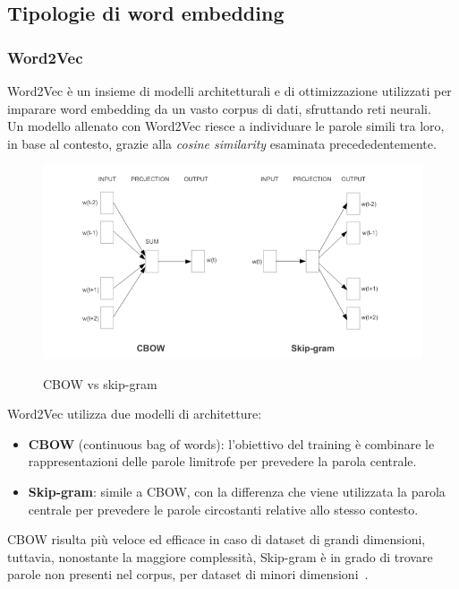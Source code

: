 \subsection{Tipologie di word embedding}
\label{sec:tipologie di word embedding}
\subsubsection{Word2Vec}
\label{sec:word2vec}
Word2Vec è un insieme di modelli architetturali e di ottimizzazione utilizzati per imparare word embedding da un vasto corpus di dati, sfruttando reti neurali.
\\
Un modello allenato con Word2Vec riesce a individuare le parole simili tra loro, in base al contesto, grazie alla \textit{cosine similarity} esaminata precededentemente.

\begin{figure}[h]
    \centering
    \includegraphics[width=15cm]{./immagini/cbow_vs_skipgram.png}
    \label{cbowskipgram}
    \caption{CBOW vs skip-gram~\cite{mikolov2013efficient}}
\end{figure}
\newpage
Word2Vec utilizza due modelli di architetture:
\begin{itemize}
    \item \textbf{CBOW} (continuous bag of words): l'obiettivo del training è combinare le rappresentazioni delle parole limitrofe per prevedere la parola centrale.
    \item \textbf{Skip-gram}: simile a CBOW, con la differenza che viene utilizzata la parola centrale per prevedere le parole circostanti relative allo stesso contesto\cite{fasttext}.
\end{itemize}

CBOW risulta più veloce ed efficace in caso di dataset di grandi dimensioni, tuttavia, nonostante la maggiore complessità, Skip-gram è in grado di trovare parole non presenti nel corpus, per dataset di minori dimensioni~\cite{mikolov2013efficient}.


